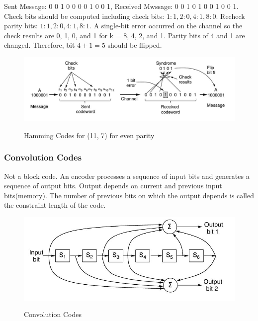 \documentclass[a4paper,oneside]{book}
\begin{document}
Sent Message: 0 0 1 0 0 0 0 1 0 0 1, Received Mwssage:  0 0 1 0 1 0 0 1 0 0 1.\\
Check bits should be computed including check bits: $1: 1, 2: 0, 4: 1, 8: 0$. Recheck parity bits: $1: 1, 2: 0, 4: 1, 8: 1$. A single-bit error occurred on the channel so the check results are 0, 1, 0, and 1 for k = 8, 4, 2, and 1. Parity bits of 4 and 1 are changed. Therefore, bit $4+1 = 5$ should be flipped.
\begin{figure}[H]
\caption{Hamming Codes for (11, 7) for even parity}
\includegraphics[scale=0.6]{Images/hammingcodes}
\label{fig:cn_hamming_codes}
\end{figure}
\subsubsection{Convolution Codes}
Not a block code. An encoder processes a sequence of input bits and generates a sequence of output bits. Output depends on current and previous input bits(memory). The number of previous bits on which the output depends is called the constraint length of the code.
\begin{figure}[H]
\caption{Convolution Codes}
\includegraphics[scale=0.6]{Images/convolutioncodes}
\label{fig:cn_convolu_code}
\end{figure}
\end{document}
